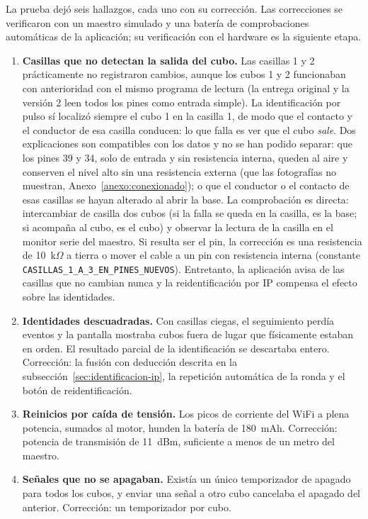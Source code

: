 \documentclass{book}
\begin{document}
La prueba dejó seis hallazgos, cada uno con su corrección. Las correcciones se verificaron con un maestro simulado y una batería de comprobaciones automáticas de la aplicación; su verificación con el hardware es la siguiente etapa.

\begin{enumerate}
    \item \textbf{Casillas que no detectan la salida del cubo.} Las casillas 1 y 2 prácticamente no registraron cambios, aunque los cubos 1 y 2 funcionaban con anterioridad con el mismo programa de lectura (la entrega original y la versión 2 leen todos los pines como entrada simple). La identificación por pulso sí localizó siempre el cubo 1 en la casilla 1, de modo que el contacto y el conductor de esa casilla conducen: lo que falla es ver que el cubo \emph{sale}. Dos explicaciones son compatibles con los datos y no se han podido separar: que los pines 39 y 34, solo de entrada y sin resistencia interna, queden al aire y conserven el nivel alto sin una resistencia externa (que las fotografías no muestran, Anexo~\ref{anexo:conexionado}); o que el conductor o el contacto de esas casillas se hayan alterado al abrir la base. La comprobación es directa: intercambiar de casilla dos cubos (si la falla se queda en la casilla, es la base; si acompaña al cubo, es el cubo) y observar la lectura de la casilla en el monitor serie del maestro. Si resulta ser el pin, la corrección es una resistencia de 10~k$\Omega$ a tierra o mover el cable a un pin con resistencia interna (constante \texttt{CASILLAS\_1\_A\_3\_EN\_PINES\_NUEVOS}). Entretanto, la aplicación avisa de las casillas que no cambian nunca y la reidentificación por IP compensa el efecto sobre las identidades.
    \item \textbf{Identidades descuadradas.} Con casillas ciegas, el seguimiento perdía eventos y la pantalla mostraba cubos fuera de lugar que físicamente estaban en orden. El resultado parcial de la identificación se descartaba entero. Corrección: la fusión con deducción descrita en la subsección~\ref{sec:identificacion-ip}, la repetición automática de la ronda y el botón de reidentificación.
    \item \textbf{Reinicios por caída de tensión.} Los picos de corriente del WiFi a plena potencia, sumados al motor, hunden la batería de 180~mAh. Corrección: potencia de transmisión de 11~dBm, suficiente a menos de un metro del maestro.
    \item \textbf{Señales que no se apagaban.} Existía un único temporizador de apagado para todos los cubos, y enviar una señal a otro cubo cancelaba el apagado del anterior. Corrección: un temporizador por cubo.

\end{enumerate}
\end{document}
